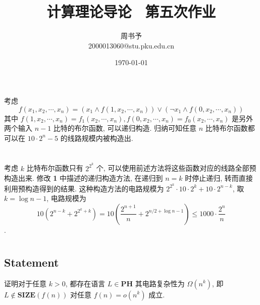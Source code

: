 \documentclass[8pt]{article}
\title{\heiti\zihao{1} 计算理论导论 \ 第五次作业}
\author{\kaishu\zihao{-3} 周书予\\2000013060@stu.pku.edu.cn}
\date{\today}
\theoremstyle{compact}
\def\le{\leqslant}
\begin{document}
\pagestyle{plain}



\maketitle

\section{}
考虑 $$f(x_1, x_2, \cdots, x_n) = (x_1 \wedge f(1, x_2, \cdots, x_n)) \vee (\lnot x_1 \wedge f(0, x_2, \cdots, x_n))$$其中 $f(1, x_2, \cdots, x_n) = f_1(x_2, \cdots, x_n), f(0, x_2, \cdots, x_n) = f_0(x_2, \cdots, x_n)$ 是另外两个输入 $n - 1$ 比特的布尔函数, 可以递归构造. 归纳可知任意 $n$ 比特布尔函数都可以在 $10 \cdot 2^n - 5$ 的线路规模内被构造出.

\section{}
考虑 $k$ 比特布尔函数只有 $2^{2^k}$ 个, 可以使用前述方法将这些函数对应的线路全部预构造出来. 修改 \textbf{1} 中描述的递归构造方法, 在递归到 $n = k$ 时停止递归, 转而直接利用预构造得到的结果. 这种构造方法的电路规模为 $2^{2^k} \cdot 10 \cdot 2^k + 10 \cdot 2^{n-k}$, 取 $k = \log n - 1$, 电路规模为 $$10\left(2^{n-k} + 2^{2^k+k}\right) = 10 \left(\frac{2^{n+1}}{n} + 2^{n/2+\log n-1}\right) \le 1000\cdot \frac{2^n}{n}$$.

\section{}
\subsection*{Statement}
证明对于任意 $k > 0$, 都存在语言 $L \in \textbf{PH}$ 其电路复杂性为 $\Omega(n^k)$, 即 $L \notin \textbf{SIZE}(f(n))$ 对任意 $f(n) = o(n^k)$ 成立.
\end{document}
